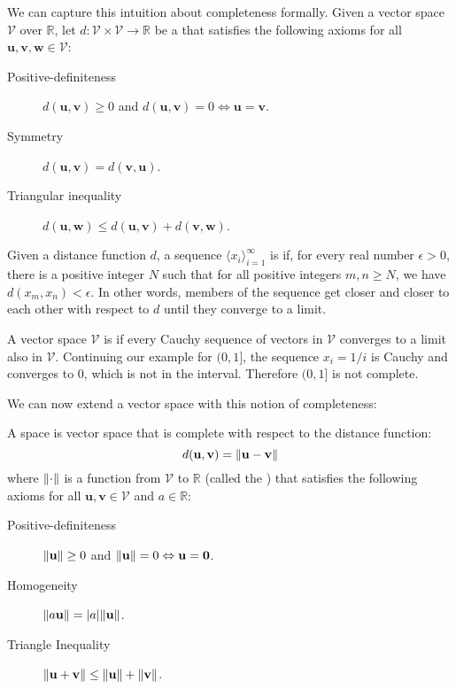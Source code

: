 We can capture this intuition about completeness formally. Given a vector space $\mathcal{V}$ over $\mathbb{R}$, let $d : \mathcal{V} \times \mathcal{V} \to \mathbb{R}$ be a  that satisfies the following axioms for all $\mathbf{u}, \mathbf{v}, \mathbf{w} \in \mathcal{V}$:
%
\begin{description}
  \item[Positive-definiteness] $d(\mathbf{u}, \mathbf{v}) \geq 0$ and $d(\mathbf{u}, \mathbf{v}) = 0 \Leftrightarrow \mathbf{u} = \mathbf{v}$.
  \item[Symmetry] $d(\mathbf{u}, \mathbf{v}) = d(\mathbf{v}, \mathbf{u})$.
  \item[Triangular inequality] $d(\mathbf{u}, \mathbf{w}) \leq d(\mathbf{u}, \mathbf{v}) + d(\mathbf{v}, \mathbf{w})$.
\end{description}
%
Given a distance function $d$, a sequence $\langle x_i \rangle_{i=1}^\infty$ is  if, for every real number $\epsilon > 0$, there is a positive integer $N$ such that for all positive integers $m, n \geq N$, we have $d(x_m, x_n) < \epsilon$. In other words, members of the sequence get closer and closer to each other with respect to $d$ until they converge to a limit.

A vector space $\mathcal{V}$ is  if every Cauchy sequence of vectors in $\mathcal{V}$ converges to a limit also in $\mathcal{V}$. Continuing our example for $(0, 1]$, the sequence $x_i = 1 / i$ is Cauchy and converges to $0$, which is not in the interval. Therefore $(0, 1]$ is not complete.

We can now extend a vector space with this notion of completeness:
%
\begin{definition}
A  space is vector space that is complete with respect to the distance function:
\begin{equation}
  d(\mathbf{u}, \mathbf{v}) = \lVert\mathbf{u} - \mathbf{v}\rVert
\end{equation}
where $\lVert\cdot\rVert$ is a function from $\mathcal{V}$ to $\mathbb{R}$ (called the ) that satisfies the following axioms for all $\mathbf{u}, \mathbf{v} \in \mathcal{V}$ and $a \in \mathbb{R}$:
\begin{description}
  \item[Positive-definiteness] $\lVert\mathbf{u}\rVert \geq 0$ and $\lVert\mathbf{u}\rVert = 0 \Leftrightarrow \mathbf{u} = \mathbf{0}$.
  \item[Homogeneity] $\lVert a \mathbf{u}\rVert = \lvert a\rvert \lVert\mathbf{u}\rVert$.
  \item[Triangle Inequality] $\lVert\mathbf{u} + \mathbf{v}\rVert \leq \lVert\mathbf{u}\rVert + \lVert\mathbf{v}\rVert$.
\end{description}
\end{definition}


